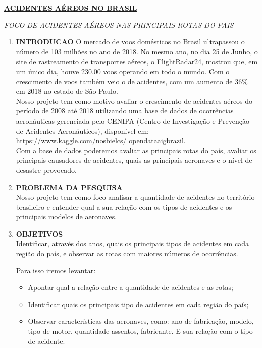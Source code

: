 \documentclass[14pt, a4paper]{article}
\begin{document}
	\begin{center}
		\underline{\textbf{ACIDENTES AÉREOS NO BRASIL}}\linebreak

		\textit{FOCO DE ACIDENTES AÉREOS NAS PRINCIPAIS ROTAS DO PAIS}\linebreak 	
	\end{center}

	\begin{enumerate}
	\item \textbf{INTRODUCAO}
	\newline
	O mercado de voos domésticos no Brasil ultrapassou o número de 103 milhões 		no ano de 2018. No mesmo ano, no dia 25 de Junho, o site de rastreamento de 	transportes aéreos, o FlightRadar24, mostrou que, em um único dia, houve 		230.00 voos operando em todo o mundo. Com o crescimento de voos também veio 	o de acidentes, com um aumento de 36\% em 2018 no estado de São Paulo. \\
		Nosso projeto tem como motivo avaliar o crescimento de acidentes aéreos 	do período de 2008 até 2018 utilizando uma base de dados de ocorrências 		aeronáuticas gerenciada pelo CENIPA (Centro de Investigação e Prevenção de 		Acidentes Aeronáuticos), disponível em:  https://www.kaggle.com/nosbielcs/		opendataaigbrazil.\\
		Com a base de dados poderemos avaliar as principais rotas do país, 			avaliar os principais causadores de acidentes, quais as principais 				aeronaves e o nível de desastre provocado. 
		 	
	
	
	
	\item \textbf{PROBLEMA DA PESQUISA}\\
	\newline
	Nosso projeto tem como foco analisar a quantidade de acidentes no território brasileiro e entender qual a sua relação com os tipos de acidentes e os principais modelos de aeronaves. 
	
 
	
	
	
	\item \textbf{OBJETIVOS}\newline
	\\
	Identificar, através dos anos, quais os principais tipos de acidentes em cada região do país, e observar as rotas com maiores números de ocorrências.
	
	\underline{Para isso iremos levantar:} 
	\begin{itemize}
	\item Apontar qual a relação entre a quantidade de acidentes e as rotas;
	\item Identificar quais os principais tipo de acidentes em cada região do país;
	\item Observar características das aeronaves, como: ano de fabricação, modelo, tipo de motor, quantidade assentos, fabricante. E sua relação com o tipo de acidente.   
	\end{itemize}		
	

\end{enumerate}
\end{document}
